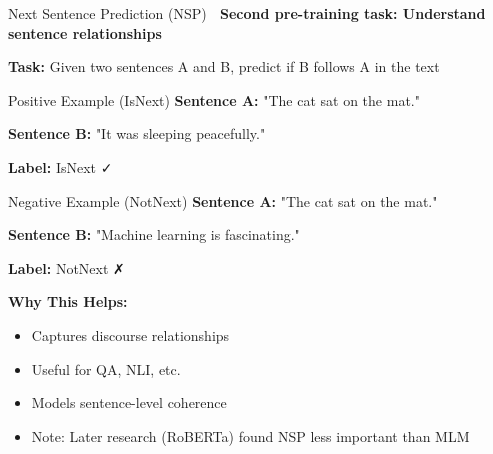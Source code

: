 \documentclass[aspectratio=169]{beamer}
\begin{document}
\begin{frame}{Next Sentence Prediction (NSP) 🔗}
\textbf{Second pre-training task: Understand sentence relationships}

\vspace{1em}

\textbf{Task:} Given two sentences A and B, predict if B follows A in the text

\vspace{0.5em}

\begin{exampleblock}{Positive Example (IsNext)}
\textbf{Sentence A:} "The cat sat on the mat."

\textbf{Sentence B:} "It was sleeping peacefully."

\textbf{Label:} IsNext ✓
\end{exampleblock}

\vspace{0.5em}

\begin{exampleblock}{Negative Example (NotNext)}
\textbf{Sentence A:} "The cat sat on the mat."

\textbf{Sentence B:} "Machine learning is fascinating."

\textbf{Label:} NotNext ✗
\end{exampleblock}

\vspace{1em}

\textbf{Why This Helps:}
\begin{itemize}\setlength{\itemsep}{0pt}
    \item Captures discourse relationships
    \item Useful for QA, NLI, etc.
    \item Models sentence-level coherence
    \item Note: Later research (RoBERTa) found NSP less important than MLM
\end{itemize}
\end{frame}
\end{document}
